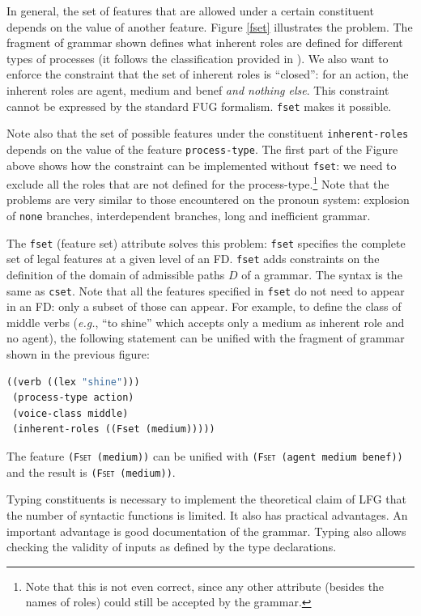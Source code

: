 \documentclass[10pt,a4paper]{report}
\begin{document}
In general, the set of features that are allowed under a certain
constituent depends on the value of another feature.  Figure \ref{fset}
illustrates the problem.  The fragment of grammar shown defines what
inherent roles are defined for different types of processes (it follows the
classification provided in \cite{Halliday85}).  We also want to enforce the
constraint that the set of inherent roles is ``closed'': for an action, the
inherent roles are agent, medium and benef {\em and nothing else}.  This
constraint cannot be expressed by the standard FUG formalism.  
{\tt fset} makes it possible.

Note also that the set of possible features under the constituent
{\tt inherent-roles} depends on the value of the feature {\tt process-type}.
The first part of the Figure above shows how the constraint can be
implemented without {\tt fset}: we need to exclude all the roles that are not
defined for the process-type.\footnote{Note that this is not even correct,
since any other attribute (besides the names of roles) could still be
accepted by the grammar.} Note that the problems are very similar to those
encountered on the pronoun system: explosion of {\tt none} branches,
interdependent branches, long and inefficient grammar.

The {\tt fset} (feature set) attribute solves this problem: {\tt fset}
specifies the complete set of legal features at a given level of an FD.
{\tt fset} adds constraints on the definition of the domain of admissible
paths $D$ of a grammar.  The syntax is the same as {\tt cset}.  Note that
all the features specified in {\tt fset} do not need to appear in an FD: only
a subset of those can appear.  For example, to define the class of middle
verbs ({\em e.g.}, ``to shine'' which accepts only a medium as inherent role
and no agent), the following statement can be unified with the fragment of
grammar shown in the previous figure:

\begin{lstlisting}[language=Lisp]
((verb ((lex "shine")))
 (process-type action)
 (voice-class middle)
 (inherent-roles ((Fset (medium)))))
\end{lstlisting} 

The feature {\tt (\textsc{Fset} (medium))} can be unified with {\tt (\textsc{Fset} (agent
medium benef))} and the result is {\tt (\textsc{Fset} (medium))}.  

Typing constituents is necessary to implement the theoretical claim of LFG
that the number of syntactic functions is limited.  It also has practical
advantages.  An important advantage is good documentation of the grammar.
Typing also allows checking the validity of inputs as defined by the type
declarations.
\end{document}
